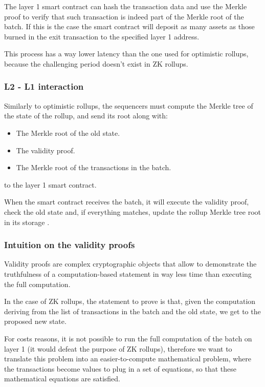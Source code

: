 \documentclass[12pt]{article}
\begin{document}
The layer 1 smart contract can hash the transaction data and use the Merkle proof to verify that such transaction is indeed part of the Merkle root of the batch. If this is the case the smart contract will deposit as many assets as those burned in the exit transaction to the specified layer 1 address.

This process has a way lower latency than the one used for optimistic rollups, because the challenging period doesn't exist in ZK rollups.

\subsubsection{L2 - L1 interaction} \label{subsubsection:zk_l2l1i}
Similarly to optimistic rollups, the sequencers must compute the Merkle tree of the state of the rollup, and send its root along with:
\begin{itemize}
    \item The Merkle root of the old state.
    \item The validity proof. 
    \item The Merkle root of the transactions in the batch. 
\end{itemize} 

to the layer 1 smart contract.

When the smart contract receives the batch, it will execute the validity proof, check the old state and, if everything matches, update the rollup Merkle tree root in its storage \cite{zk_rollups}.

\subsubsection{Intuition on the validity proofs} \label{subsubsection:iotvp}
Validity proofs are complex cryptographic objects that allow to demonstrate the truthfulness of a computation-based statement in way less time than executing the full computation.

In the case of ZK rollups, the statement to prove is that, given the computation deriving from the list of transactions in the batch and the old state, we get to the proposed new state.

For costs reasons, it is not possible to run the full computation of the batch on layer 1 (it would defeat the purpose of ZK rollups), therefore we want to translate this problem into an easier-to-compute mathematical problem, where the transactions become values to plug in a set of equations, so that these mathematical equations are satisfied.
\end{document}

